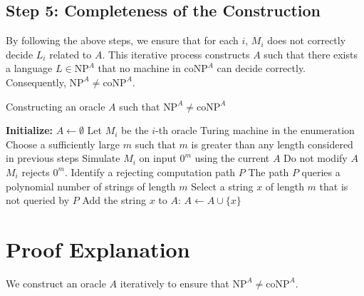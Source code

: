 \documentclass{article}
\begin{document}
\subsection*{Step 5: Completeness of the Construction}

By following the above steps, we ensure that for each $i$, $M_i$ does not correctly decide $L_i$ related to $A$. This iterative process constructs $A$ such that there exists a language $L \in \text{NP}^A$ that no machine in $\text{coNP}^A$ can decide correctly. Consequently, $\text{NP}^A \neq \text{coNP}^A$.

\begin{mdframed}
\begin{algorithm}[H]
\caption{Constructing an oracle $A$ such that $\text{NP}^A \neq \text{coNP}^A$}
\begin{algorithmic}[1]
\STATE \textbf{Initialize:} $A \leftarrow \emptyset$
    \STATE Let $M_i$ be the $i$-th oracle Turing machine in the enumeration
    \STATE Choose a sufficiently large $m$ such that $m$ is greater than any length considered in previous steps
    \STATE Simulate $M_i$ on input $0^m$ using the current $A$
        \STATE Do not modify $A$
    \ELSE
        \STATE $M_i$ rejects $0^m$. Identify a rejecting computation path $P$
        \STATE The path $P$ queries a polynomial number of strings of length $m$
        \STATE Select a string $x$ of length $m$ that is not queried by $P$
        \STATE Add the string $x$ to $A$: $A \leftarrow A \cup \{x\}$
    \ENDIF
\ENDFOR
\end{algorithmic}
\end{algorithm}
\end{mdframed}

\section*{Proof Explanation}

We construct an oracle $A$ iteratively to ensure that $\text{NP}^A \neq \text{coNP}^A$. 
\end{document}
